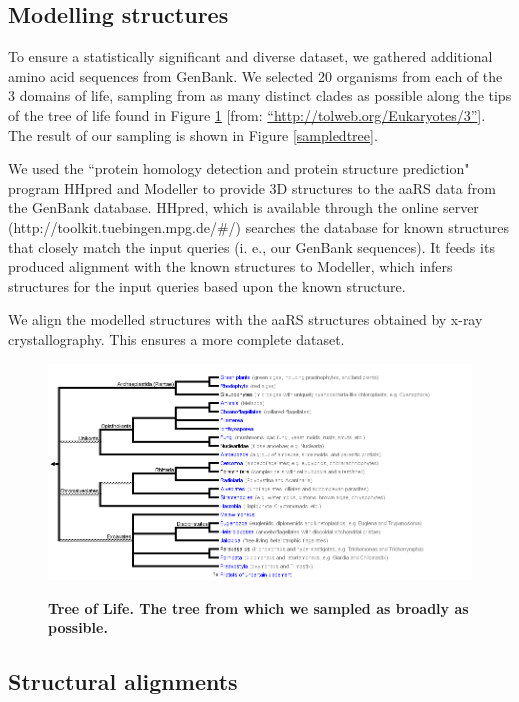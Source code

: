\documentclass[10pt,letterpaper]{article}
\begin{document}
\subsection*{Modelling structures}
To ensure a statistically significant and diverse dataset, we gathered additional amino acid sequences from GenBank.  
We selected 20 organisms from each of the 3 domains of life, sampling from as many distinct clades as possible along the tips of the tree of life found in Figure \ref{treeoflife} [from: \hyperref[label_name]{``http://tolweb.org/Eukaryotes/3''}]. 
The result of our sampling is shown in Figure \ref{sampledtree}.

We used the ``protein homology detection and protein structure prediction" program HHpred \cite{HHpred} and Modeller \cite{Modeller} to provide 3D structures to the aaRS data from the GenBank database.  
HHpred, which is available through the online server (http://toolkit.tuebingen.mpg.de/\#/) searches the database for known structures that closely match the input queries (i. e., our GenBank sequences).  
It feeds its produced alignment with the known structures to Modeller, which infers structures for the input queries based upon the known structure.

We align the modelled structures with the aaRS structures obtained by x-ray crystallography.  This ensures a more complete dataset.


\begin{figure}
  \caption{\bf Tree of Life.  The tree from which we sampled as broadly as possible.}
  \centering
    \includegraphics[width=\textwidth]{Eukaryotes.png}
  \label{treeoflife}  
\end{figure}



\subsection*{Structural alignments}
\end{document}
